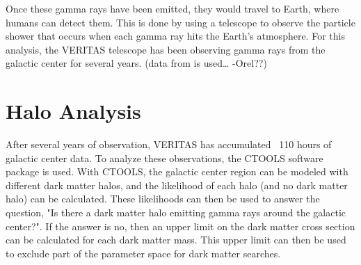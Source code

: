 Once these gamma rays have been emitted, they would travel to Earth, where humans can detect them.
This is done by using a telescope to observe the particle shower that occurs when each gamma ray hits the Earth's atmosphere.
For this analysis, the VERITAS telescope has been observing gamma rays from the galactic center for several years.
{\color{red}(data from is used… -Orel??)}


\section{Halo Analysis}
After several years of observation, VERITAS has accumulated ~110 hours of galactic center data.
To analyze these observations, the CTOOLS software package \cite{gammalibctools} is used.
With CTOOLS, the galactic center region can be modeled with different dark matter halos, and the likelihood of each halo (and no dark matter halo) can be calculated.
These likelihoods can then be used to answer the question, "Is there a dark matter halo emitting gamma rays around the galactic center?".
If the answer is no, then an upper limit on the dark matter cross section can be calculated for each dark matter mass.
This upper limit can then be used to exclude part of the parameter space for dark matter searches.


